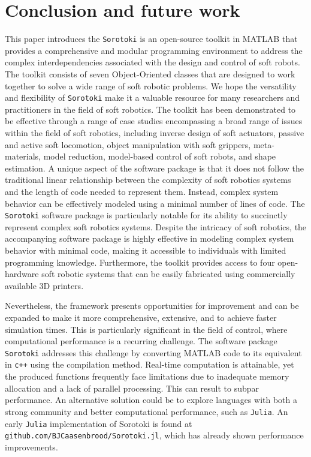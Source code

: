 
\section{Conclusion and future work}
\label{sec:C5:conclusion}
This paper introduces the \texttt{Sorotoki} is an open-source toolkit in {MATLAB} that provides a comprehensive and modular programming environment to address the complex interdependencies associated with the design and control of soft robots. The toolkit consists of seven Object-Oriented classes that are designed to work together to solve a wide range of soft robotic problems. We hope the versatility and flexibility of \texttt{Sorotoki} make it a valuable resource for many researchers and practitioners in the field of soft robotics. The toolkit has been demonstrated to be effective through a range of case studies encompassing a broad range of issues within the field of soft robotics, including inverse design of soft actuators, passive and active soft locomotion, object manipulation with soft grippers, meta-materials, model reduction, model-based control of soft robots, and shape estimation. A unique aspect of the software package is that it does not follow the traditional linear relationship between the complexity of soft robotics systems and the length of code needed to represent them. Instead, complex system behavior can be effectively modeled using a minimal number of lines of code. The \texttt{Sorotoki} software package is particularly notable for its ability to succinctly represent complex soft robotics systems. Despite the intricacy of soft robotics, the accompanying software package is highly effective in modeling complex system behavior with minimal code, making it accessible to individuals with limited programming knowledge. Furthermore, the toolkit provides access to four open-hardware soft robotic systems that can be easily fabricated using commercially available 3D printers.

Nevertheless, the framework presents opportunities for improvement and can be expanded to make it more comprehensive, extensive, and to achieve faster simulation times. This is particularly significant in the field of control, where computational performance is a recurring challenge. The software package \texttt{Sorotoki} addresses this challenge by converting {MATLAB} code to its equivalent in \texttt{c++} using the compilation method. Real-time computation is attainable, yet the produced  functions frequently face limitations due to inadequate memory allocation and a lack of parallel processing. This can result to subpar performance. An alternative solution could be to explore languages with both a strong community and better computational performance, such as \texttt{Julia}. An early \texttt{Julia} implementation of Sorotoki is found at \texttt{github.com/BJCaasenbrood/Sorotoki.jl}, which has already shown performance improvements.

